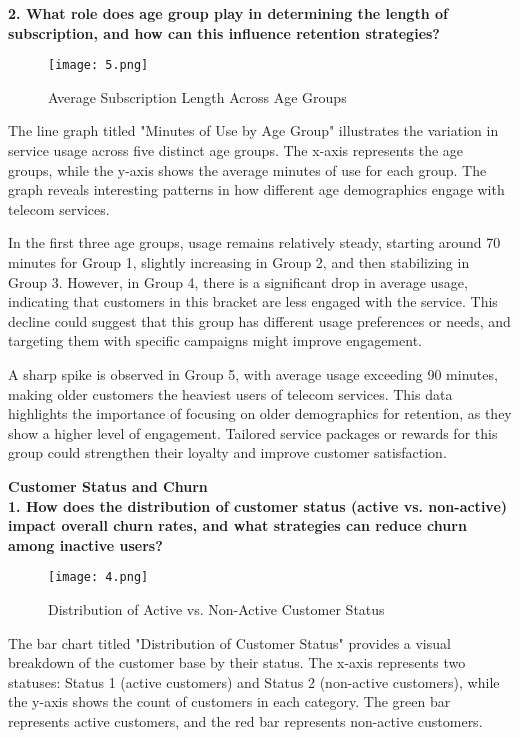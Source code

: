 \documentclass[12pt]{article}
\begin{document}
\textbf{2. What role does age group play in determining the length of subscription, and how can this influence retention strategies?}
\begin{figure}[h]
    \centering
    \texttt{[image: 5.png]}  
    \caption{Average Subscription Length Across Age Groups}
\end{figure}
\FloatBarrier
The line graph titled "Minutes of Use by Age Group" illustrates the variation in service usage across five distinct age groups. The x-axis represents the age groups, while the y-axis shows the average minutes of use for each group. The graph reveals interesting patterns in how different age demographics engage with telecom services.

In the first three age groups, usage remains relatively steady, starting around 70 minutes for Group 1, slightly increasing in Group 2, and then stabilizing in Group 3. However, in Group 4, there is a significant drop in average usage, indicating that customers in this bracket are less engaged with the service. This decline could suggest that this group has different usage preferences or needs, and targeting them with specific campaigns might improve engagement.

A sharp spike is observed in Group 5, with average usage exceeding 90 minutes, making older customers the heaviest users of telecom services. This data highlights the importance of focusing on older demographics for retention, as they show a higher level of engagement. Tailored service packages or rewards for this group could strengthen their loyalty and improve customer satisfaction.

\vspace{
7cm}
\textbf{Customer Status and Churn}\\

\textbf{1. How does the distribution of customer status (active vs. non-active) impact overall churn rates, and what strategies can reduce churn among inactive users?}
\begin{figure}[h]
    \centering
    \texttt{[image: 4.png]}  
    \caption{Distribution of Active vs. Non-Active Customer Status}
\end{figure}
\FloatBarrier
The bar chart titled "Distribution of Customer Status" provides a visual breakdown of the customer base by their status. The x-axis represents two statuses: Status 1 (active customers) and Status 2 (non-active customers), while the y-axis shows the count of customers in each category. The green bar represents active customers, and the red bar represents non-active customers.
\end{document}
